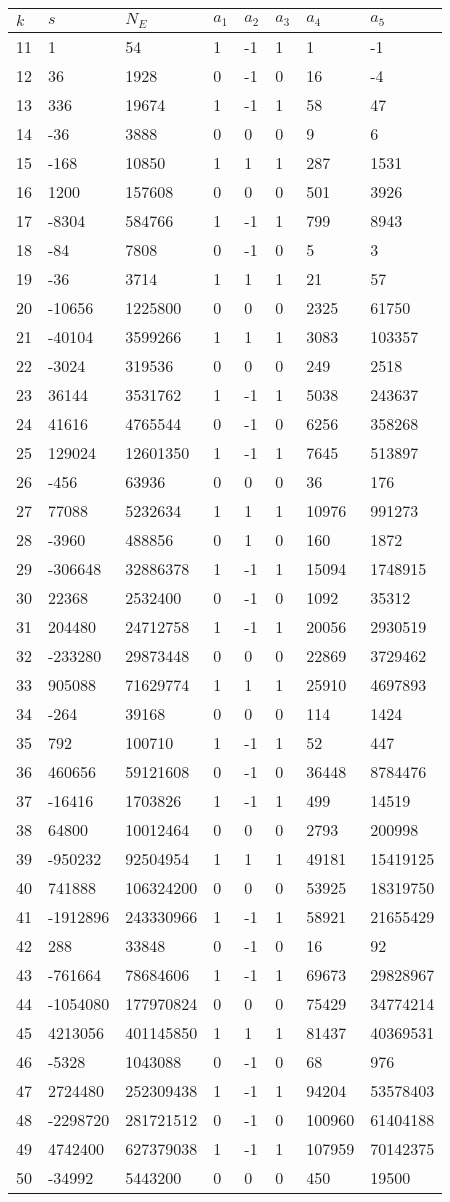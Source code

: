 \documentclass{amsart}
\begin{document}
\begin{longtable}{|l|l|l|lllll|}
\hline
$k$ & $s$ & $N_E$ & $a_1$ & $a_2$ & $a_3$ & $a_4$ & $a_5$\\
\hline
11&1&54&1&-1&1&1&-1\\
12&36&1928&0&-1&0&16&-4\\
13&336&19674&1&-1&1&58&47\\
14&-36&3888&0&0&0&9&6\\
15&-168&10850&1&1&1&287&1531\\
16&1200&157608&0&0&0&501&3926\\
17&-8304&584766&1&-1&1&799&8943\\
18&-84&7808&0&-1&0&5&3\\
19&-36&3714&1&1&1&21&57\\
20&-10656&1225800&0&0&0&2325&61750\\
21&-40104&3599266&1&1&1&3083&103357\\
22&-3024&319536&0&0&0&249&2518\\
23&36144&3531762&1&-1&1&5038&243637\\
24&41616&4765544&0&-1&0&6256&358268\\
25&129024&12601350&1&-1&1&7645&513897\\
26&-456&63936&0&0&0&36&176\\
27&77088&5232634&1&1&1&10976&991273\\
28&-3960&488856&0&1&0&160&1872\\
29&-306648&32886378&1&-1&1&15094&1748915\\
30&22368&2532400&0&-1&0&1092&35312\\
31&204480&24712758&1&-1&1&20056&2930519\\
32&-233280&29873448&0&0&0&22869&3729462\\
33&905088&71629774&1&1&1&25910&4697893\\
34&-264&39168&0&0&0&114&1424\\
35&792&100710&1&-1&1&52&447\\
36&460656&59121608&0&-1&0&36448&8784476\\
37&-16416&1703826&1&-1&1&499&14519\\
38&64800&10012464&0&0&0&2793&200998\\
39&-950232&92504954&1&1&1&49181&15419125\\
40&741888&106324200&0&0&0&53925&18319750\\
41&-1912896&243330966&1&-1&1&58921&21655429\\
42&288&33848&0&-1&0&16&92\\
43&-761664&78684606&1&-1&1&69673&29828967\\
44&-1054080&177970824&0&0&0&75429&34774214\\
45&4213056&401145850&1&1&1&81437&40369531\\
46&-5328&1043088&0&-1&0&68&976\\
47&2724480&252309438&1&-1&1&94204&53578403\\
48&-2298720&281721512&0&-1&0&100960&61404188\\
49&4742400&627379038&1&-1&1&107959&70142375\\
50&-34992&5443200&0&0&0&450&19500\\
\hline
\end{longtable}
\end{document}
